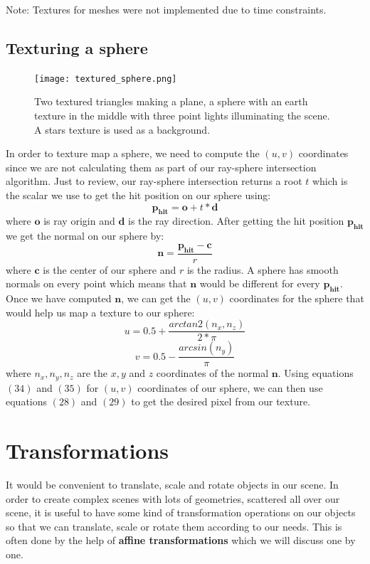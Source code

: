 \documentclass[11pt,a4paper]{article}
\begin{document}
	\noindent
	Note: Textures for meshes were not implemented due to time constraints.
	
	\subsection{Texturing a sphere}
	\begingroup
	\setlength{\intextsep}{5pt}
	\setlength{\columnsep}{35pt}
	\begin{figure}
		\centering
		\texttt{[image: textured\_sphere.png]}
		\caption{Two textured triangles making a plane, a sphere with an earth texture in the middle with three point lights illuminating the scene. A stars texture is used as a background.}\label{fig:textured_sphere}
	\end{figure}
	In order to texture map a sphere, we need to compute the $(u, v)$ coordinates since we are not calculating them as part of our ray-sphere intersection algorithm. Just to review, our ray-sphere intersection returns a root $t$ which is the scalar we use to get the hit position on our sphere using:
	\begin{equation}
		\boldsymbol{p_{hit}} = \boldsymbol{o} + t*\boldsymbol{d} 
	\end{equation}
	where $\boldsymbol{o}$ is ray origin and $\boldsymbol{d}$ is the ray direction. After getting the hit position $\boldsymbol{p_{hit}}$ we get the normal on our sphere by:
	\begin{equation}
		\boldsymbol{{n}} = \frac{\boldsymbol{p_{hit}} - \boldsymbol{c}}{r}
	\end{equation}
	where $\boldsymbol{c}$ is the center of our sphere and $r$ is the radius. A sphere has smooth normals on every point which means that $\boldsymbol{n}$ would be different for every $\boldsymbol{p_{hit}}$. Once we have computed $\boldsymbol{n}$, we can get the $(u, v)$ coordinates for the sphere that would help us map a texture to our sphere:
	\begin{equation}
		u = 0.5 + \frac{arctan2(n_{x}, n_{z})}{2 * \pi}
	\end{equation}
	\begin{equation}
		v = 0.5 - \frac{arcsin(n_{y})}{\pi}
	\end{equation}
	where $n_{x}, n_{y}, n_{z}$ are the $x, y$ and $z$ coordinates of the normal $\boldsymbol{n}$. Using equations $(34)$ and $(35)$ for $(u, v)$ coordinates of our sphere, we can then use equations $(28)$ and $(29)$ to get the desired pixel from our texture.
	\endgroup
	\section{Transformations}
	It would be convenient to translate, scale and rotate objects in our scene. In order to create complex scenes with lots of geometries, scattered all over our scene, it is useful to have some kind of transformation operations on our objects so that we can translate, scale or rotate them according to our needs. This is often done by the help of \textbf{affine transformations} which we will discuss one by one.
\end{document}
